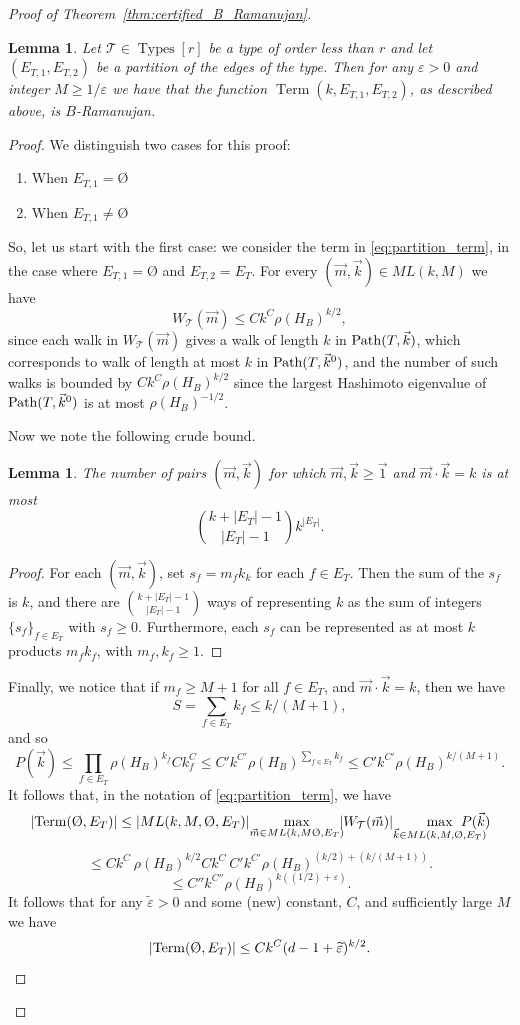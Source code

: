 \documentclass{memo-l}
\theoremstyle{plain}
\newtheorem{lemma}[theorem]{Lemma}
\theoremstyle{definition}
\numberwithin{section}{chapter}
\numberwithin{equation}{chapter}
\DeclareMathOperator{\Types}{Types}
\DeclareMathOperator{\Term}{Term}
\renewcommand{\emptyset}{\text{\O}}
\theoremstyle{plain}
\newtheorem{lem}[theorem]{Lemma}
\theoremstyle{definition}
\newcommand\cT{\mathcal{T}}
\begin{document}
\begin{proof}[Proof of Theorem~\ref{thm:certified_B_Ramanujan}]
\begin{lemma}\label{le:CertTr_B_ramanujan_expansion} Let \( \cT \in
\Types[r] \) be a type of order less than \( r \) and let \(
(E_{T,1},E_{T,2}) \) be a partition of the edges of the type. Then for any
\( \varepsilon > 0 \) and integer \( M \geq 1/\varepsilon \) we have that
the function \( \Term(k, E_{T,1}, E_{T,2}) \), as described above, is \( B
\)-Ramanujan.  
\end{lemma} \begin{proof} We distinguish two cases for this
proof: \begin{enumerate}[label= (\arabic*)] \item When \( E_{T,1} =
\emptyset \) \item When \( E_{T,1} \neq \emptyset \) \end{enumerate} So,
let us start with the first case: we consider the term in
\eqref{eq:partition_term}, in the case where $E_{T,1}=\emptyset$ and
$E_{T,2}=E_T$.  For every $(\vec m,\vec k)\in ML(k,M)$ we have $$
W_\cT(\vec m) \leq Ck^C \rho(H_B)^{k/2}, $$ since each walk in $W_\cT(\vec m)$
gives a walk of length $k$ in ${\rm Path}(T,\vec k)$, which corresponds to
walk of length at most $k$ in ${\rm Path}(T,\vec k^0)$, and the number of
such walks is bounded by $Ck^C \rho(H_B)^{k/2}$ since the largest Hashimoto
eigenvalue of ${\rm Path}(T,\vec k^0)$ is at most $\rho(H_B)^{-1/2}$.

Now we note the following crude bound.  \begin{lem} The number of pairs
$(\vec m,\vec k)$ for which $\vec m, \vec k \geq \vec 1$ and $\vec
m\cdot\vec k=k$ is at most $$ \binom{k+|E_T|-1}{|E_T|-1}  k^{|E_T|}.  $$
\end{lem} \begin{proof} For each $(\vec m,\vec k)$, set $s_f=m_f k_k$ for
each $f\in E_T$.  Then the sum of the $s_f$ is $k$, and there are
$\binom{k+|E_T|-1}{|E_T|-1}$ ways of representing $k$ as the sum of
integers $\{s_f\}_{f\in E_T}$ with $s_f\geq 0$.  Furthermore, each $s_f$
can be represented as at most $k$ products $m_f k_f$, with $m_f,k_f\geq 1$.
\end{proof}

Finally, we notice that if $m_f\geq M+1$ for all $f\in E_T$, and $\vec
m\cdot\vec k=k$, then we have $$ S=\sum_{f\in E_T} k_f \leq k/(M+1), $$ and
so $$ P(\vec k) \leq \prod_{f\in E_T} \rho(H_B)^{k_f} Ck_f^C \leq C'k^{C'}
\rho(H_B)^{\sum_{f\in E_T} k_f} \leq C' k^{C'} \rho(H_B)^{k/(M+1)}.  $$ It follows
that, in the notation of \eqref{eq:partition_term}, we have $$ | {\rm
Term}(\emptyset,E_T) | \leq |ML(k,M,\emptyset,E_T)| \ \!\!\! \max_{\vec
m\in ML(k,M\emptyset,E_T)} \!\!\! |W_\cT(\vec m)| \   \!\!\! \max_{\vec
k\in ML(k,M,\emptyset,E_T)} \!\!\!\!\!\!\!\!\!\!\!\!P(\vec k) $$ $$ \leq
Ck^C \ \rho(H_B)^{k/2} Ck^C \ C' k^{C'} \rho(H_B)^{(k/2) + (k/(M+1))} .  $$ $$ \leq
C'' k^{C''} \rho(H_B)^{k((1/2)+\varepsilon)}.  $$ It follows that for any
$\widetilde{\varepsilon}>0$ and some (new) constant, $C$, and sufficiently
large $M$ we have $$ | {\rm Term}(\emptyset,E_T) |  \leq Ck^C
(d-1+\widetilde{\varepsilon})^{k/2} .  $$


\end{proof}
\end{proof}
\end{document}
